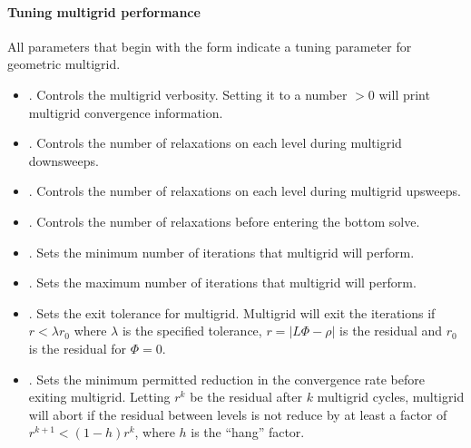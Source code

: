 \documentclass[letterpaper,10pt,english]{sphinxmanual}
\begin{document}
\paragraph{Tuning multigrid performance}
\label{\detokenize{Solvers/RTE:tuning-multigrid-performance}}
All parameters that begin with the form  indicate a tuning parameter for geometric multigrid.
\begin{itemize}
\item {} 
.
Controls the multigrid verbosity.
Setting it to a number \(> 0\) will print multigrid convergence information.

\item {} 
.
Controls the number of relaxations on each level during multigrid downsweeps.

\item {} 
.
Controls the number of relaxations on each level during multigrid upsweeps.

\item {} 
.
Controls the number of relaxations before entering the bottom solve.

\item {} 
.
Sets the minimum number of iterations that multigrid will perform.

\item {} 
.
Sets the maximum number of iterations that multigrid will perform.

\item {} 
.
Sets the exit tolerance for multigrid.
Multigrid will exit the iterations if \(r < \lambda r_0\) where \(\lambda\) is the specified tolerance, \(r = |L\Phi -\rho|\) is the residual and \(r_0\) is the residual for \(\Phi = 0\).

\item {} 
.
Sets the minimum permitted reduction in the convergence rate before exiting multigrid.
Letting \(r^k\) be the residual after \(k\) multigrid cycles, multigrid will abort if the residual between levels is not reduce by at least a factor of \(r^{k+1} < (1-h)r^k\), where \(h\) is the “hang” factor.


\end{itemize}
\end{document}
